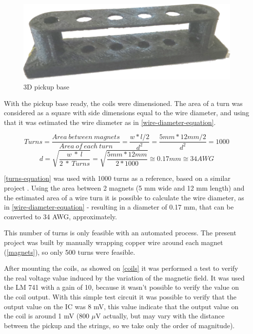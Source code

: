 \begin{figure}[!htpb]
\centering
\caption{3D pickup base}
\label{3D-base}
\includegraphics[scale=0.2]{images/base}
\end{figure}

With the pickup base ready, the coils were dimensioned. The area of a turn
was considered as a square with side dimensions equal to the wire diameter, and using that
it was estimated the wire diameter as in \autoref{wire-diameter-equation}.

\begin{equation}
  \label{turns-equation}
  Turns = \frac{Area\ between\ magnets}{Area\ of\ each\ turn} = \frac{ w * l / 2 }{ d^{2} } = \frac{5 mm * 12 mm / 2}{d^2} = 1000
\end{equation}
\begin{equation}
  \label{wire-diameter-equation}
  d = \sqrt{\frac{w\ *\ l}{2\ *\ Turns}} = \sqrt{\frac{5 mm * 12 mm}{2*1000}} \cong 0.17 mm \cong 34 AWG
\end{equation}

\autoref{turns-equation} was used with 1000 turns as a reference, based on a similar project
\cite{hexaphonic-pickup}. Using the area between 2 magnets (5 mm wide
and 12 mm length) and the estimated area of a wire turn it is possible to calculate the wire diameter,
as in \autoref{wire-diameter-equation} - resulting in a diameter of 0.17 mm, that can be
converted to 34 AWG, approximately. 

This number of turns is only feasible with an automated process. The present project was built by manually
wrapping copper wire around each magnet (\autoref{magnets}), so only 500 turns were feasible. 

After mounting the coils, as showed on \autoref{coils} it was performed a test to verify the real voltage value induced by
the variation of the magnetic field. It was used the LM 741 \cite{LM741} with a gain of 10,
because it wasn't possible to verify the value on the coil output. With this simple test circuit
it was possible to verify that the output value on the IC was 8 mV, this value indicate that the
output value on the coil is around 1 mV (800 $\mu$V actually, but may vary with the distance between the
pickup and the strings, so we take only the order of magnitude).

